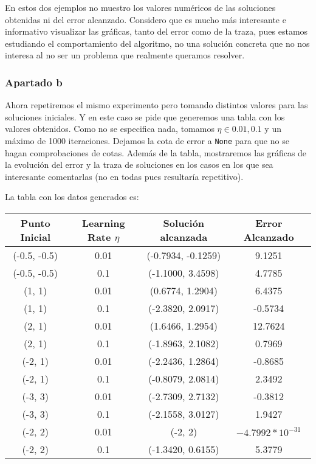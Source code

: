 \documentclass[11pt]{article}
\begin{document}
En estos dos ejemplos no muestro los valores numéricos de las soluciones obtenidas ni del error alcanzado. Considero que es mucho más interesante e informativo visualizar las gráficas, tanto del error como de la traza, pues estamos estudiando el comportamiento del algoritmo, no una solución concreta que no nos interesa al no ser un problema que realmente queramos resolver.

\subsubsection{Apartado b}

Ahora repetiremos el mismo experimento pero tomando distintos valores para las soluciones iniciales. Y en este caso se pide que generemos una tabla con los valores obtenidos. Como no se especifica nada, tomamos $\eta \in {0.01, 0.1}$ y un máximo de 1000 iteraciones. Dejamos la cota de error a \lstinline{None} para que no se hagan comprobaciones de cotas. Además de la tabla, mostraremos las gráficas de la evolución del error y la traza de soluciones en los casos en los que sea interesante comentarlas (no en todas pues resultaría repetitivo).

La tabla con los datos generados es:

\begin{center}
    \begin{tabular}{| c | c | c | c |}
        Punto Inicial & Learning Rate $\eta$ & Solución alcanzada & Error Alcanzado \\
        \hline
        (-0.5, -0.5) & 0.01 & (-0.7934, -0.1259) & 9.1251\\
        (-0.5, -0.5) & 0.1 & (-1.1000, 3.4598) & 4.7785 \\
        (1, 1) & 0.01 & (0.6774, 1.2904) & 6.4375 \\
        (1, 1) & 0.1 & (-2.3820, 2.0917) & -0.5734 \\
        (2, 1) & 0.01 & (1.6466, 1.2954) & 12.7624 \\
        (2, 1) & 0.1 & (-1.8963,  2.1082) & 0.7969 \\
        (-2,  1) & 0.01 & (-2.2436,  1.2864) & -0.8685 \\
        (-2,  1) & 0.1 & (-0.8079, 2.0814) & 2.3492 \\
        (-3,  3) & 0.01 & (-2.7309,  2.7132) & -0.3812 \\
        (-3,  3) & 0.1 & (-2.1558,  3.0127) & 1.9427 \\
        (-2,  2) & 0.01 & (-2,  2) & $-4.7992 * 10^{-31}$ \\
        (-2,  2) & 0.1 & (-1.3420, 0.6155) & 5.3779 \\


    \end{tabular}

\end{center}
\end{document}
